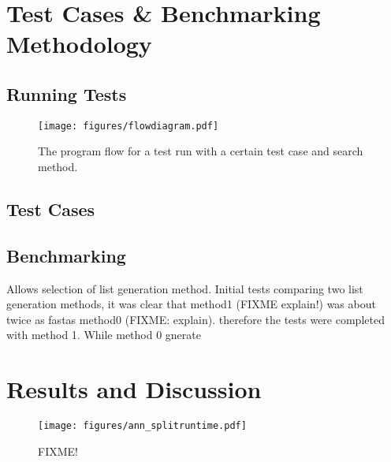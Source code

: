 \chapter{Test Cases \& Benchmarking Methodology}
\label{CHAPTER:BENCHMARKING}

\section{Running Tests}
\label{SECTION:TESTS}

\begin{figure}[h]
	\centering
	\texttt{[image: figures/flowdiagram.pdf]}
	\caption{The program flow for a test run with a certain test case and search method.}
\end{figure}


\section{Test Cases}

\section{Benchmarking}

Allows selection of list generation method. Initial tests comparing two list generation methods, it was clear that method1 (FIXME explain!) was about twice as fastas method0 (FIXME: explain). therefore the tests were completed with method 1. While method 0 gnerate 

\chapter{Results and Discussion}

\begin{table}[htbp]
	\centering
	\renewcommand{\arraystretch}{1.3} %
      
\end{table}



\begin{figure}[h]
	\centering
	\texttt{[image: figures/ann\_splitruntime.pdf]}
	\caption{FIXME!}
\end{figure}

